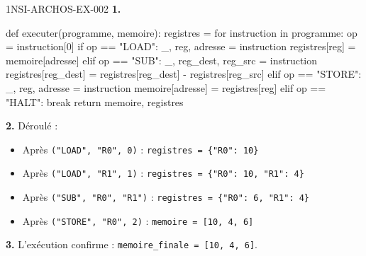 \begin{corrige}{1NSI-ARCHOS-EX-002}
\textbf{1.}
\begin{python}
def executer(programme, memoire):
    registres = {}
    for instruction in programme:
        op = instruction[0]
        if op == "LOAD":
            _, reg, adresse = instruction
            registres[reg] = memoire[adresse]
        elif op == "SUB":
            _, reg_dest, reg_src = instruction
            registres[reg_dest] = registres[reg_dest] - registres[reg_src]
        elif op == "STORE":
            _, reg, adresse = instruction
            memoire[adresse] = registres[reg]
        elif op == "HALT":
            break
    return memoire, registres
\end{python}

\textbf{2.} Déroulé :
\begin{itemize}
  \item Après \lstinline{("LOAD", "R0", 0)} : \lstinline|registres = {"R0": 10}|
  \item Après \lstinline{("LOAD", "R1", 1)} : \lstinline|registres = {"R0": 10, "R1": 4}|
  \item Après \lstinline{("SUB", "R0", "R1")} : \lstinline|registres = {"R0": 6, "R1": 4}|
  \item Après \lstinline{("STORE", "R0", 2)} : \lstinline{memoire = [10, 4, 6]}
\end{itemize}

\textbf{3.} L'exécution confirme : \lstinline{memoire_finale = [10, 4, 6]}.
\end{corrige}
